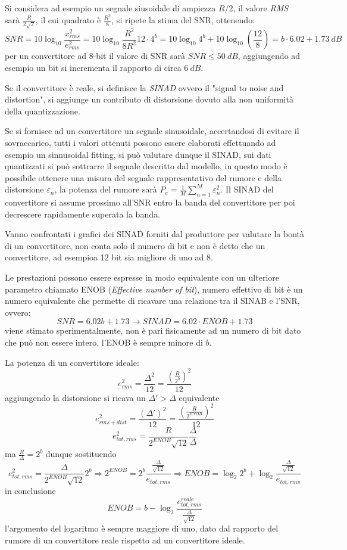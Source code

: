 Si considera ad esempio un segnale siusoidale di ampiezza $R/2$, il valore 
\textit{RMS} sarà $\frac{R}{2\sqrt{2}}$, il cui quadrato è $\frac{R^2}{8}$, si 
ripete la stima del SNR, ottenendo:
$$
SNR = 10\log_{10} \frac{x_{rms}^2}{e^2_{rms}} = 10\log_{10}\frac{R^2}{8R^2}
12\cdot 4^b = 10\log_{10}4^b + 10\log_{10}(\frac{12}{8}) =
 b\cdot 6.02 + 1.73\ dB
$$
per un convertitore ad 8-bit il valore di SNR sarà $SNR \leq 50\ dB$, 
aggiungendo ad esempio un bit si incrementa il rapporto di circa $6\ dB$.

Se il convertitore è reale, si definisce la \textit{SINAD} ovvero il "signal to 
noise and distortion", si aggiunge un contributo di distorsione dovuto alla non 
uniformità della quantizzazione.

Se si fornisce ad un convertitore un segnale sinusoidale, accertandosi di 
evitare
il sovraccarico, tutti i valori ottenuti possono essere elaborati effettuando 
ad esempio un sinnusoidal fitting, si può valutare dunque il SINAD, sui dati 
quantizzati si può sottrarre il segnale descritto dal modello, in questo modo è 
possibile ottenere una misura del segnale rappresentativo del rumore e della 
distorsione $\varepsilon_n$, la potenza del rumore sarà
$P_e = \frac{1}{M}\sum_{n=1}^{M} \varepsilon^2_n$.
Il SINAD del convertitore si assume prossimo all'SNR entro la banda del 
convertitore per poi decrescere rapidamente superata la banda.

Vanno confrontati i grafici dei SINAD forniti dal produttore per valutare
la bontà di un convertitore, non conta solo il numero di bit e non è detto che 
un convertitore, ad esempioa 12 bit sia migliore di uno ad 8.

Le prestazioni possono essere espresse in modo equivalente con un ulteriore 
parametro chiamato ENOB (\textit{Effective number of bit}), numero effettivo di 
bit è un numero equivalente che permette di ricavare una relazione tra il SINAB 
e l'SNR, ovvero:
$$
SNR = 6.02b + 1.73 \rightarrow SINAD = 6.02\cdot ENOB + 1.73
$$
viene stimato sperimentalmente, non è pari fisicamente ad un numero di bit dato che può non essere intero, l'ENOB è sempre minore di $b$.

La potenza di un convertitore ideale:
$$
e^2_{rms} = \frac{\Delta^2}{12} = \frac{\left(\frac{R}{2^b}\right)^2}{12}
$$
aggiungendo la distorsione si ricava un $\Delta'>\Delta$ equivalente
$$
e^2_{rms+dist} = \frac{(\Delta')^2}{12} = \frac{\left(\frac{R}{2^{ENOB}}\right)^2}{12}
$$
$$
e^2_{tot,rms} = \frac{R}{2^{ENOB}\sqrt{12}} \frac{\Delta}{\Delta} 
$$
ma $\frac{R}{\Delta} = 2^b$ dunque sostituendo
$$
e^2_{tot,rms} = \frac{\Delta}{2^{ENOB}\sqrt{12}}2^b \Rightarrow 2^{ENOB} = 
2^b\frac{\frac{\Delta}{\sqrt{12}}}{e_{tot,rms}} \Rightarrow ENOB = \log_2 2^b + 
\log_2 \frac{\frac{\Delta}{\sqrt{12}}}{e_{tot,rms}} 
$$
in conclusione
$$
ENOB = b - \log_2 \frac{e^{reale}_{tot,rms}}{\frac{\Delta}{\sqrt{12}}}
$$
l'argomento del logaritmo è sempre maggiore di uno, dato dal rapporto del rumore
di un convertitore reale rispetto ad un convertitore ideale.

